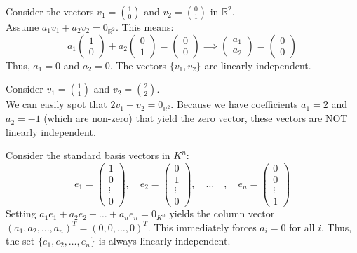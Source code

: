 \begin{example}[In $\mathbb{R}^2$]
Consider the vectors $v_1 = \binom{1}{0}$ and $v_2 = \binom{0}{1}$ in $\mathbb{R}^2$. \\
Assume $a_1 v_1 + a_2 v_2 = 0_{\mathbb{R}^2}$. This means:
\[
a_1 \begin{pmatrix} 1 \\ 0 \end{pmatrix} + a_2 \begin{pmatrix} 0 \\ 1 \end{pmatrix} = \begin{pmatrix} 0 \\ 0 \end{pmatrix} \implies \begin{pmatrix} a_1 \\ a_2 \end{pmatrix} = \begin{pmatrix} 0 \\ 0 \end{pmatrix}
\]
Thus, $a_1 = 0$ and $a_2 = 0$. The vectors $\{v_1, v_2\}$ are linearly independent.
\end{example}

\begin{example}
Consider $v_1 = \binom{1}{1}$ and $v_2 = \binom{2}{2}$. \\
We can easily spot that $2 v_1 - v_2 = 0_{\mathbb{R}^2}$. Because we have coefficients $a_1 = 2$ and $a_2 = -1$ (which are non-zero) that yield the zero vector, these vectors are NOT linearly independent.
\end{example}

\begin{example}
Consider the standard basis vectors in $K^n$:
\[
e_1 = \begin{pmatrix} 1 \\ 0 \\ \vdots \\ 0 \end{pmatrix}, \quad e_2 = \begin{pmatrix} 0 \\ 1 \\ \vdots \\ 0 \end{pmatrix}, \quad \dots \quad, \quad e_n = \begin{pmatrix} 0 \\ 0 \\ \vdots \\ 1 \end{pmatrix}
\]
Setting $a_1 e_1 + a_2 e_2 + \dots + a_n e_n = 0_{K^n}$ yields the column vector $(a_1, a_2, \dots, a_n)^T = (0, 0, \dots, 0)^T$. This immediately forces $a_i = 0$ for all $i$. Thus, the set $\{e_1, e_2, \dots, e_n\}$ is always linearly independent.
\end{example}

